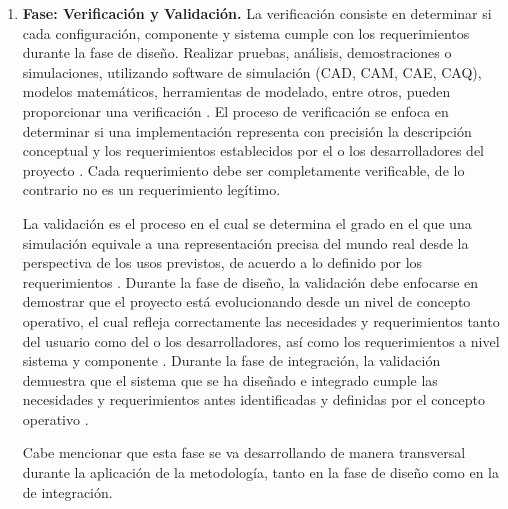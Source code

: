 \begin{enumerate}
	\item \textbf{Fase: Verificación y Validación.}	La verificación consiste en determinar si cada configuración, componente y sistema cumple con los requerimientos durante la fase de diseño. Realizar pruebas, análisis, demostraciones o simulaciones, utilizando software de simulación (CAD, CAM, CAE, CAQ), modelos matemáticos, herramientas de modelado, entre otros, pueden proporcionar una verificación \cite{M14}. El proceso de verificación se enfoca en determinar si una implementación representa con precisión la descripción conceptual y los requerimientos establecidos por el o los desarrolladores del proyecto \cite{M15}. Cada requerimiento debe ser completamente verificable, de lo contrario no es un requerimiento legítimo.
	
	La validación es el proceso en el cual se determina el grado en el que una simulación equivale a una representación precisa del mundo real desde la perspectiva de los usos previstos, de acuerdo a lo definido por los requerimientos \cite{M15}. Durante la fase de diseño, la validación debe enfocarse en demostrar que el proyecto está evolucionando desde un nivel de concepto operativo, el cual refleja correctamente las necesidades y requerimientos tanto del usuario como del o los desarrolladores, así como los requerimientos a nivel sistema y componente \cite{M14}. Durante la fase de integración, la validación demuestra que el sistema que se ha diseñado e integrado cumple las necesidades y requerimientos antes identificadas y definidas por el concepto operativo \cite{M14}.
	
	Cabe mencionar que esta fase se va desarrollando de manera transversal durante la aplicación de la metodología, tanto en la fase de diseño como en la de integración.
\end{enumerate}

